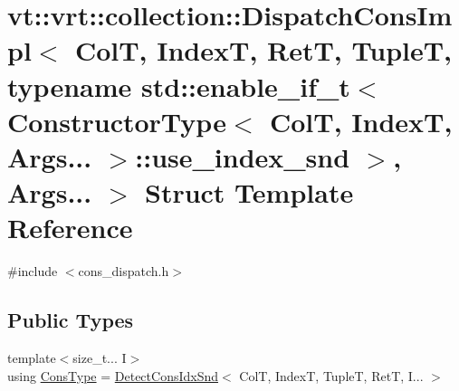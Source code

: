 \hypertarget{structvt_1_1vrt_1_1collection_1_1_dispatch_cons_impl_3_01_col_t_00_01_index_t_00_01_ret_t_00_01_dd689f23c5fa7346ae8a5efd9cf9f29e}{}\section{vt\+:\+:vrt\+:\+:collection\+:\+:Dispatch\+Cons\+Impl$<$ ColT, IndexT, RetT, TupleT, typename std\+:\+:enable\+\_\+if\+\_\+t$<$ Constructor\+Type$<$ ColT, IndexT, Args... $>$\+:\+:use\+\_\+index\+\_\+snd $>$, Args... $>$ Struct Template Reference}
\label{structvt_1_1vrt_1_1collection_1_1_dispatch_cons_impl_3_01_col_t_00_01_index_t_00_01_ret_t_00_01_dd689f23c5fa7346ae8a5efd9cf9f29e}


{\ttfamily \#include $<$cons\+\_\+dispatch.\+h$>$}

\subsection*{Public Types}
\begin{DoxyCompactItemize}
\item 
{\footnotesize template$<$size\+\_\+t... I$>$ }\\using \hyperlink{structvt_1_1vrt_1_1collection_1_1_dispatch_cons_impl_3_01_col_t_00_01_index_t_00_01_ret_t_00_01_dd689f23c5fa7346ae8a5efd9cf9f29e_ab72c81bd39a0f6108587fb423ce22512}{Cons\+Type} = \hyperlink{structvt_1_1vrt_1_1collection_1_1_detect_cons_idx_snd}{Detect\+Cons\+Idx\+Snd}$<$ ColT, IndexT, TupleT, RetT, I... $>$
\end{DoxyCompactItemize}


